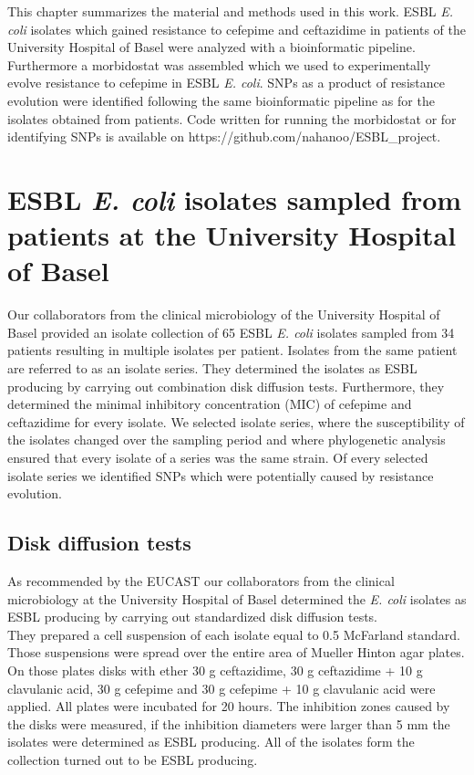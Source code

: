 This chapter summarizes the material and methods used in this work. ESBL \textit{E. coli} isolates which gained resistance to cefepime and ceftazidime in patients of the University Hospital of Basel were analyzed with a bioinformatic pipeline. Furthermore a morbidostat was assembled which we used to experimentally evolve resistance to cefepime in ESBL \textit{E. coli}. SNPs as a product of resistance evolution were identified following the same bioinformatic pipeline as for the isolates obtained from patients. Code written for running the morbidostat or for identifying SNPs is available on  https://github.com/nahanoo/ESBL\_project.

\section{ESBL \textit{E. coli} isolates sampled from patients at the University Hospital of Basel}
Our collaborators from the clinical microbiology of the University Hospital of Basel provided an isolate collection of 65 ESBL \textit{E. coli} isolates sampled from 34 patients resulting in multiple isolates per patient. Isolates from the same patient are referred to as an isolate series. They determined the isolates as ESBL producing by carrying out combination disk diffusion tests. Furthermore, they determined the minimal inhibitory concentration (MIC) of cefepime and ceftazidime for every isolate. We selected isolate series, where the susceptibility of the isolates changed over the sampling period and where phylogenetic analysis ensured that every isolate of a series was the same strain. Of every selected isolate series we identified SNPs which were potentially caused by resistance evolution. 
\label{section:sample_collection}

\subsection{Disk diffusion tests}
As recommended by the EUCAST our collaborators from the clinical microbiology at the University Hospital of Basel determined the \textit{E. coli} isolates as ESBL producing by carrying out standardized disk diffusion tests. \\
They prepared a cell suspension of each isolate equal to 0.5 McFarland standard. Those suspensions were spread over the entire area of Mueller Hinton agar plates. On those plates disks with ether 30 \textmu g ceftazidime, 30 \textmu g ceftazidime + 10 \textmu g clavulanic acid, 30 \textmu g cefepime and 30 \textmu g cefepime + 10 \textmu g clavulanic acid were applied. All plates were incubated for 20 hours. The inhibition zones caused by the disks were measured, if the inhibition diameters were larger than 5 mm the isolates were determined as ESBL producing. All of the isolates form the collection turned out to be ESBL producing. 


